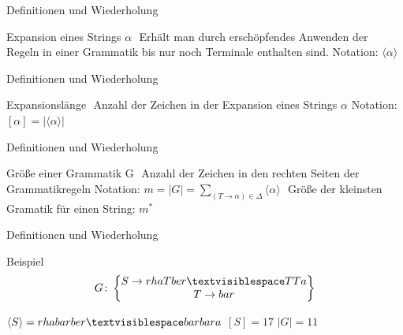 \documentclass{beamer}
\begin{document}
\begin{frame}{Definitionen und Wiederholung}
\begin{block}{Expansion  eines Strings $\alpha$}
	$ $ \linebreak
	Erhält man durch erschöpfendes Anwenden der Regeln in einer Grammatik bis nur noch Terminale enthalten sind. \linebreak
	Notation: $\langle \alpha \rangle$
\end{block}
\end{frame}

\begin{frame}{Definitionen und Wiederholung}
\begin{block}{Expansionslänge}
	$ $ \linebreak
	Anzahl der Zeichen in der Expansion eines Strings $\alpha$ \linebreak
	Notation: $[\alpha]  = \lvert \langle \alpha \rangle \lvert$
\end{block}
\end{frame}

\begin{frame}{Definitionen und Wiederholung}
\begin{block}{Größe einer Grammatik G}
	$ $ \linebreak
	Anzahl der Zeichen in den rechten Seiten der Grammatikregeln\linebreak
	Notation: $m = \lvert G \lvert = \sum\limits_{(T \rightarrow \alpha) \in \Delta} \langle \alpha \rangle$ \linebreak $ $\linebreak
	Größe der kleinsten Gramatik für einen String: $m^*$
\end{block}
\end{frame}

\begin{frame}{Definitionen und Wiederholung}
\begin{block}{Beispiel}
	$$
	G \colon \begin{Bmatrix} 
		S \rightarrow rhaTber \textvisiblespace TTa \\
		T \rightarrow bar
	\end{Bmatrix}
	$$
	
	$\langle S \rangle = rhabarber \textvisiblespace barbara$ \linebreak
	$[S] = 17$ \linebreak
	$\lvert G \lvert = 11$
\end{block}
\end{frame}
\end{document}
